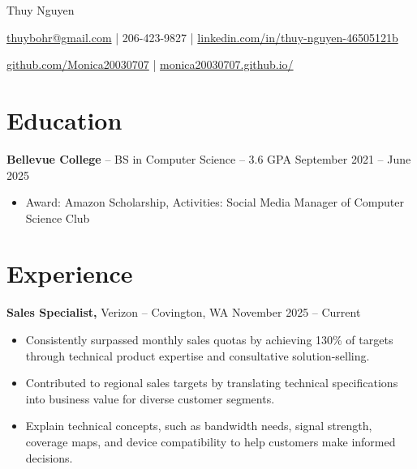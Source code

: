\documentclass[11pt]{article}       %
\begin{document}
\centerline{\Huge Thuy Nguyen}

\vspace{5pt}

\centerline{\href{mailto:thuybohr@gmail.com}{thuybohr@gmail.com} | 206-423-9827 |
\href{https://www.linkedin.com/in/thuy-nguyen-46505121b/}{linkedin.com/in/thuy-nguyen-46505121b}}

\centerline{\href{https://github.com/Monica20030707}{github.com/Monica20030707} | 
\href{https://monica20030707.github.io/}{monica20030707.github.io/}} 

\vspace{-9pt}

\section*{Education}
\textbf{Bellevue College} -- BS in Computer Science -- 3.6 GPA \hfill September 2021 -- June 2025\\
\vspace{-9pt}
\begin{itemize}
  \item Award: Amazon Scholarship, Activities: Social Media Manager of Computer Science Club
\end{itemize}

\vspace{-18.5pt}

\section*{Experience}

\textbf{Sales Specialist,} {Verizon} -- Covington, WA \hfill November 2025 -- Current \\
\vspace{-9pt}
\begin{itemize}
  \item Consistently surpassed monthly sales quotas by achieving 130\% of targets through technical product expertise and consultative solution-selling.
  \item Contributed to regional sales targets by translating technical specifications into business value for diverse customer segments.
  \item Explain technical concepts, such as bandwidth needs, signal strength, coverage maps, and device compatibility to help customers make informed decisions.
\end{itemize}
\end{document}
